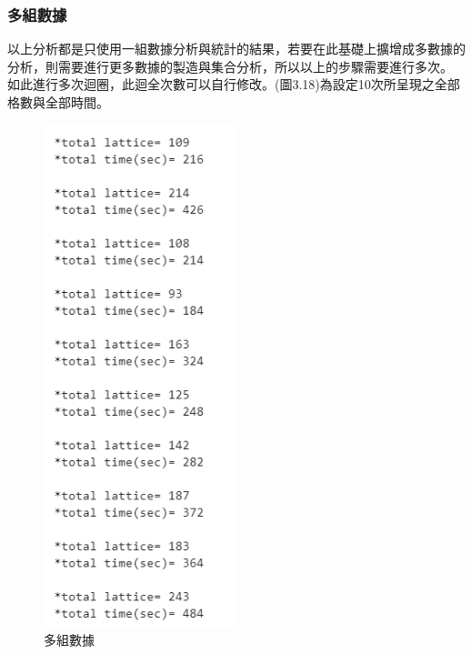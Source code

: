 \subsubsection{多組數據}
以上分析都是只使用一組數據分析與統計的結果，若要在此基礎上擴增成多數據的分析，則需要進行更多數據的製造與集合分析，所以以上的步驟需要進行多次。
如此進行多次迴圈，此迴全次數可以自行修改。(圖3.18)為設定10次所呈現之全部格數與全部時間。
\begin{figure}[H] 
	\centering 
	\includegraphics[width=0.5\textwidth]{3_17.png} 
	\caption{多組數據} 
	\label{Fig.3.18} 
\end{figure}

